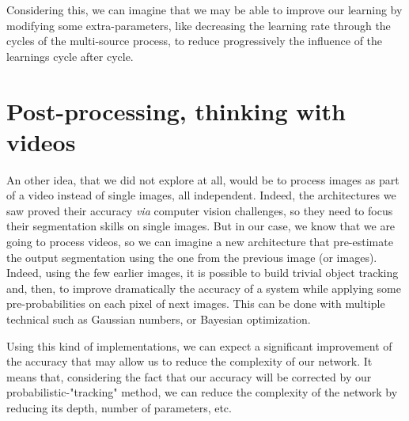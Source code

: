 Considering this, we can imagine that we may be able to improve our learning by modifying some extra-parameters, like decreasing the learning rate through the cycles of the multi-source process, to reduce progressively the influence of the learnings cycle after cycle.



\section{Post-processing, thinking with videos}
An other idea, that we did not explore at all, would be to process images as part of a video instead of single images, all independent. Indeed, the architectures we saw proved their accuracy \textit{via} computer vision challenges, so they need to focus their segmentation skills on single images. But in our case, we know that we are going to process videos, so we can imagine a new architecture that pre-estimate the output segmentation using the one from the previous image (or images). Indeed, using the few earlier images, it is possible to build trivial object tracking and, then, to improve dramatically the accuracy of a system while applying some pre-probabilities on each pixel of next images. This can be done with multiple technical such as Gaussian numbers, or Bayesian optimization.

Using this kind of implementations, we can expect a significant improvement of the accuracy that may allow us to reduce the complexity of our network. It means that, considering the fact that our accuracy will be corrected by our probabilistic-"tracking" method, we can reduce the complexity of the network by reducing its depth, number of parameters, etc.



